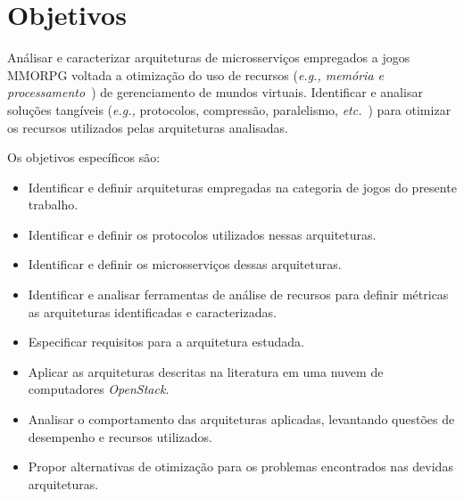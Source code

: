 \section{Objetivos}
\label{obj}

Análisar e caracterizar arquiteturas de microsserviços empregados a jogos \ac{MMORPG} voltada a otimização do uso de recursos (\textit{\textit{e.g.,} memória e processamento}~\cite{1417630}) de gerenciamento de mundos virtuais.
%
Identificar e analisar soluções tangíveis (\textit{e.g.,} protocolos, compressão, paralelismo, \textit{etc.}~\cite{1417630}) para otimizar os recursos utilizados pelas arquiteturas analisadas.

Os objetivos específicos são:
\begin{itemize}
    \item Identificar e definir arquiteturas empregadas na categoria de jogos do presente trabalho.
    \item Identificar e definir os protocolos utilizados nessas arquiteturas.
    \item Identificar e definir os microsserviços dessas arquiteturas.
    \item Identificar e analisar ferramentas de análise de recursos para definir métricas as arquiteturas identificadas e caracterizadas.
    \item Especificar requisitos para a arquitetura estudada.
    \item Aplicar as arquiteturas descritas na literatura em uma nuvem de computadores \textit{OpenStack}.
    \item Analisar o comportamento das arquiteturas aplicadas, levantando questões de desempenho e recursos utilizados.
    \item Propor alternativas de otimização para os problemas encontrados nas devidas arquiteturas.
\end{itemize}
